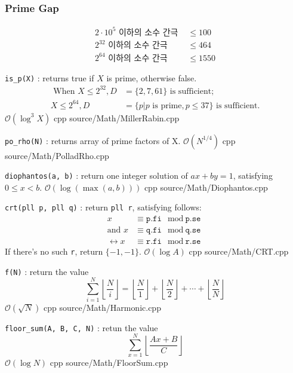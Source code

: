 \documentclass[portrait, 8pt, a4paper, oneside, twocolumn]{extarticle}
\begin{document}
\subsubsection{Prime Gap}
\begin{align*}
    2 \cdot 10^{5} \text{ 이하의 소수 간극 }  &\le 100\\
    2^{32} \text{ 이하의 소수 간극 } &\le 464 \\
    2^{64} \text{ 이하의 소수 간극 } &\le 1550
\end{align*}

{\texttt{is\_p(X)} : returns true if $X$ is prime, otherwise false.
\begin{align*} 
\text{ When } X \le 2^{32}, D &= \{2, 7, 61\} \text{ is sufficient; } \\
X \le 2^{64},  D &= \{p | p \text{ is prime}, p \le 37 \}  \text{  is sufficient.}
\end{align*}}
{$\mathcal O (\log^3 X)$}
{cpp}
{source/Math/MillerRabin.cpp}

{ \texttt{po\_rho(N)} : returns array of prime factors of X.}
{$\mathcal O (N^{1/4})$}
{cpp}
{source/Math/PolladRho.cpp}

{\texttt{diophantos(a, b)} : return one integer solution of $ax+by=1$, satisfying $0 \le x < b$. }
{$\mathcal O \left(\log \left( \max(a, b) \right) \right)$}
{cpp}
{source/Math/Diophantos.cpp}

{\texttt{crt(pll p, pll q)} : return \texttt{pll r}, satisfying follows:
\begin{align*}
   x &\equiv \texttt{p.fi} \mod \texttt{p.se} \\
\text{and } x &\equiv \texttt{q.fi} \mod \texttt{q.se} \\
   \leftrightarrow x &\equiv \texttt{r.fi} \mod \texttt{r.se} 
\end{align*}
If there's no such \texttt{r}, return $\{-1, -1\}$.
}
{$\mathcal O(\log A)$}
{cpp}
{source/Math/CRT.cpp}

{\texttt{f(N)} : return the value 
$$\sum_{i=1}^{N} \left\lfloor \frac{N}{i} \right\rfloor = \left\lfloor \frac{N}{1}\right\rfloor + \left\lfloor \frac{N}{2} \right\rfloor + \cdots + \left\lfloor \frac{N}{N}\right\rfloor  $$}
{$\mathcal O(\sqrt N )$}
{cpp}
{source/Math/Harmonic.cpp}

{\texttt{floor\_sum(A, B, C, N)} : retun the value 
$$\sum_{x=1}^{N} \left\lfloor  \frac{Ax+B}{C} \right\rfloor $$}
{$\mathcal O(\log N)$}
{cpp}
{source/Math/FloorSum.cpp}
\end{document}
